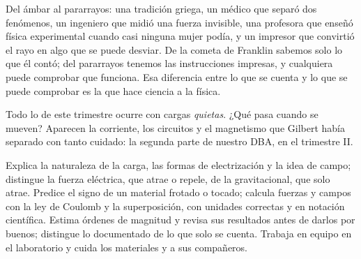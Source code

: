 \documentclass[11pt]{article}
\begin{document}

Del ámbar al pararrayos: una tradición griega, un médico que separó dos
fenómenos, un ingeniero que midió una fuerza invisible, una profesora que
enseñó física experimental cuando casi ninguna mujer podía, y un impresor que
convirtió el rayo en algo que se puede desviar. De la cometa de Franklin
sabemos solo lo que él contó; del pararrayos tenemos las instrucciones
impresas, y cualquiera puede comprobar que funciona. Esa diferencia entre lo
que se cuenta y lo que se puede comprobar es la que hace ciencia a la física.

Todo lo de este trimestre ocurre con cargas \emph{quietas}. ¿Qué pasa cuando
se mueven? Aparecen la corriente, los circuitos y el magnetismo que Gilbert
había separado con tanto cuidado: la segunda parte de nuestro DBA, en el
trimestre II.

\matrizevaluacion
  {Explica la naturaleza de la carga, las formas de electrización y la idea de
   campo; distingue la fuerza eléctrica, que atrae o repele, de la
   gravitacional, que solo atrae.}
  {Predice el signo de un material frotado o tocado; calcula fuerzas y campos
   con la ley de Coulomb y la superposición, con unidades correctas y en
   notación científica.}
  {Estima órdenes de magnitud y revisa sus resultados antes de darlos por
   buenos; distingue lo documentado de lo que solo se cuenta.}
  {Trabaja en equipo en el laboratorio y cuida los materiales y a sus
   compañeros.}

\autoevaluacion

\seguimientodocente
\end{document}
